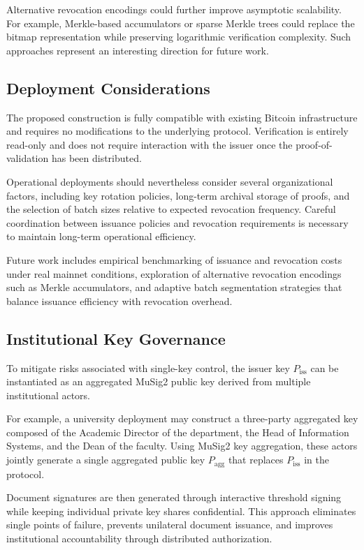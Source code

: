 \documentclass{IEEEoj}
\begin{document}
Alternative revocation encodings could further improve asymptotic scalability.
For example, Merkle-based accumulators or sparse Merkle trees could replace the
bitmap representation while preserving logarithmic verification complexity.
Such approaches represent an interesting direction for future work.

\subsection{Deployment Considerations}

The proposed construction is fully compatible with existing Bitcoin infrastructure and requires no modifications to the underlying protocol. 
Verification is entirely read-only and does not require interaction with the issuer once the proof-of-validation has been distributed.

Operational deployments should nevertheless consider several organizational factors, including key rotation policies, long-term archival storage of proofs, and the selection of batch sizes relative to expected revocation frequency. 
Careful coordination between issuance policies and revocation requirements is necessary to maintain long-term operational efficiency.

Future work includes empirical benchmarking of issuance and revocation costs under real mainnet conditions, exploration of alternative revocation encodings such as Merkle accumulators, and adaptive batch segmentation strategies that balance issuance efficiency with revocation overhead.

\subsection{Institutional Key Governance}

To mitigate risks associated with single-key control, the issuer key $P_{\mathrm{iss}}$ can be instantiated as an aggregated MuSig2 public key derived from multiple institutional actors.

For example, a university deployment may construct a three-party aggregated key composed of the Academic Director of the department, the Head of Information Systems, and the Dean of the faculty. 
Using MuSig2 key aggregation, these actors jointly generate a single aggregated public key $P_{\mathrm{agg}}$ that replaces $P_{\mathrm{iss}}$ in the protocol.

Document signatures are then generated through interactive threshold signing while keeping individual private key shares confidential. 
This approach eliminates single points of failure, prevents unilateral document issuance, and improves institutional accountability through distributed authorization.
\end{document}
